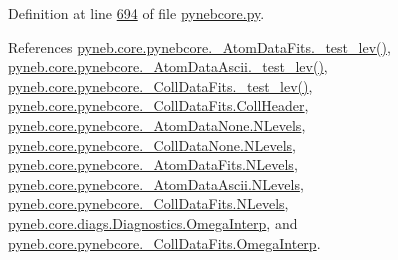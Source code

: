 Definition at line \hyperlink{pynebcore_8py_source_l00694}{694} of file \hyperlink{pynebcore_8py_source}{pynebcore.\+py}.



References \hyperlink{pynebcore_8py_source_l00171}{pyneb.\+core.\+pynebcore.\+\_\+\+Atom\+Data\+Fits.\+\_\+test\+\_\+lev()}, \hyperlink{pynebcore_8py_source_l00435}{pyneb.\+core.\+pynebcore.\+\_\+\+Atom\+Data\+Ascii.\+\_\+test\+\_\+lev()}, \hyperlink{pynebcore_8py_source_l00660}{pyneb.\+core.\+pynebcore.\+\_\+\+Coll\+Data\+Fits.\+\_\+test\+\_\+lev()}, \hyperlink{pynebcore_8py_source_l00621}{pyneb.\+core.\+pynebcore.\+\_\+\+Coll\+Data\+Fits.\+Coll\+Header}, \hyperlink{pynebcore_8py_source_l00062}{pyneb.\+core.\+pynebcore.\+\_\+\+Atom\+Data\+None.\+N\+Levels}, \hyperlink{pynebcore_8py_source_l00075}{pyneb.\+core.\+pynebcore.\+\_\+\+Coll\+Data\+None.\+N\+Levels}, \hyperlink{pynebcore_8py_source_l00155}{pyneb.\+core.\+pynebcore.\+\_\+\+Atom\+Data\+Fits.\+N\+Levels}, \hyperlink{pynebcore_8py_source_l00404}{pyneb.\+core.\+pynebcore.\+\_\+\+Atom\+Data\+Ascii.\+N\+Levels}, \hyperlink{pynebcore_8py_source_l00637}{pyneb.\+core.\+pynebcore.\+\_\+\+Coll\+Data\+Fits.\+N\+Levels}, \hyperlink{diags_8py_source_l00000}{pyneb.\+core.\+diags.\+Diagnostics.\+Omega\+Interp}, and \hyperlink{pynebcore_8py_source_l00655}{pyneb.\+core.\+pynebcore.\+\_\+\+Coll\+Data\+Fits.\+Omega\+Interp}.


